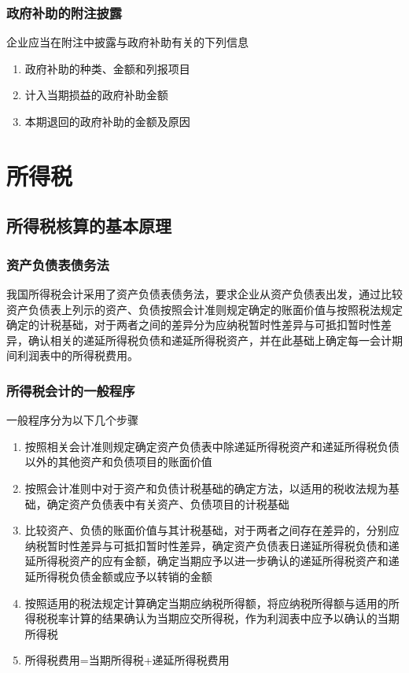 \documentclass[UTF8,12pt]{ctexart}
\numberwithin{equation}{section} %
\numberwithin{figure}{section}
\numberwithin{table}{section}
\begin{document}
	\subsubsection{政府补助的附注披露}
	企业应当在附注中披露与政府补助有关的下列信息
	\begin{enumerate}
		\item 政府补助的种类、金额和列报项目
		
		\item 计入当期损益的政府补助金额
		
		\item 本期退回的政府补助的金额及原因
	\end{enumerate}
	
	\newpage
	\section{所得税}
	\subsection{所得税核算的基本原理}
	\subsubsection{资产负债表债务法}
	我国所得税会计采用了资产负债表债务法，要求企业从资产负债表出发，通过比较资产负债表上列示的资产、负债按照会计准则规定确定的账面价值与按照税法规定确定的计税基础，对于两者之间的差异分为应纳税暂时性差异与可抵扣暂时性差异，确认相关的递延所得税负债和递延所得税资产，并在此基础上确定每一会计期间利润表中的所得税费用。
	
	\subsubsection{所得税会计的一般程序}
	一般程序分为以下几个步骤
	\begin{enumerate}
		\item 按照相关会计准则规定确定资产负债表中除递延所得税资产和递延所得税负债以外的其他资产和负债项目的账面价值
		
		\item 按照会计准则中对于资产和负债计税基础的确定方法，以适用的税收法规为基础，确定资产负债表中有关资产、负债项目的计税基础
		
		\item 比较资产、负债的账面价值与其计税基础，对于两者之间存在差异的，分别应纳税暂时性差异与可抵扣暂时性差异，确定资产负债表日递延所得税负债和递延所得税资产的应有金额，确定当期应予以进一步确认的递延所得税资产和递延所得税负债金额或应予以转销的金额
		
		\item 按照适用的税法规定计算确定当期应纳税所得额，将应纳税所得额与适用的所得税税率计算的结果确认为当期应交所得税，作为利润表中应予以确认的当期所得税
		
		\item 所得税费用=当期所得税+递延所得税费用
	\end{enumerate}
	
\end{document}
